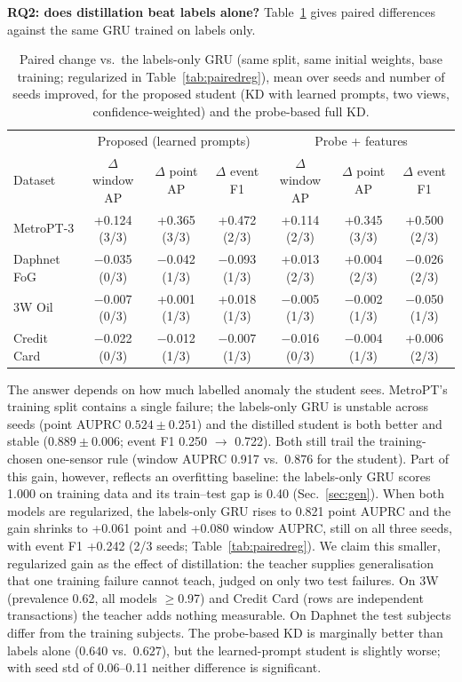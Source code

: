 \documentclass[twoside,english]{article}
\begin{document}
\textbf{RQ2: does distillation beat labels alone?} Table~\ref{tab:paired} gives paired differences against the same GRU trained on labels only.

\begin{table}[h]
\centering\small
\caption{Paired change vs.\ the labels-only GRU (same split, same initial weights, base training; regularized in Table~\ref{tab:pairedreg}), mean over seeds and number of seeds improved, for the proposed student (KD with learned prompts, two views, confidence-weighted) and the probe-based full KD.}
\label{tab:paired}
\begin{tabular}{lcccccc}
\toprule
 & \multicolumn{3}{c}{Proposed (learned prompts)} & \multicolumn{3}{c}{Probe + features} \\
Dataset & $\Delta$ window AP & $\Delta$ point AP & $\Delta$ event F1 & $\Delta$ window AP & $\Delta$ point AP & $\Delta$ event F1 \\
\midrule
MetroPT-3 & +0.124 (3/3) & +0.365 (3/3) & +0.472 (2/3) & +0.114 (2/3) & +0.345 (3/3) & +0.500 (2/3) \\
Daphnet FoG & $-$0.035 (0/3) & $-$0.042 (1/3) & $-$0.093 (1/3) & +0.013 (2/3) & +0.004 (2/3) & $-$0.026 (2/3) \\
3W Oil & $-$0.007 (0/3) & +0.001 (1/3) & +0.018 (1/3) & $-$0.005 (1/3) & $-$0.002 (1/3) & $-$0.050 (1/3) \\
Credit Card & $-$0.022 (0/3) & $-$0.012 (1/3) & $-$0.007 (1/3) & $-$0.016 (0/3) & $-$0.004 (1/3) & +0.006 (2/3) \\
\bottomrule
\end{tabular}
\end{table}

The answer depends on how much labelled anomaly the student sees. MetroPT's training split contains a single failure; the labels-only GRU is unstable across seeds (point AUPRC $0.524\pm0.251$) and the distilled student is both better and stable ($0.889\pm0.006$; event F1 0.250 $\rightarrow$ 0.722). Both still trail the training-chosen one-sensor rule (window AUPRC 0.917 vs.\ 0.876 for the student). Part of this gain, however, reflects an overfitting baseline: the labels-only GRU scores 1.000 on training data and its train--test gap is 0.40 (Sec.~\ref{sec:gen}). When both models are regularized, the labels-only GRU rises to 0.821 point AUPRC and the gain shrinks to +0.061 point and +0.080 window AUPRC, still on all three seeds, with event F1 +0.242 (2/3 seeds; Table~\ref{tab:pairedreg}). We claim this smaller, regularized gain as the effect of distillation: the teacher supplies generalisation that one training failure cannot teach, judged on only two test failures. On 3W (prevalence 0.62, all models $\geq$0.97) and Credit Card (rows are independent transactions) the teacher adds nothing measurable. On Daphnet the test subjects differ from the training subjects. The probe-based KD is marginally better than labels alone ($0.640$ vs.\ $0.627$), but the learned-prompt student is slightly worse; with seed std of 0.06--0.11 neither difference is significant.
\end{document}
